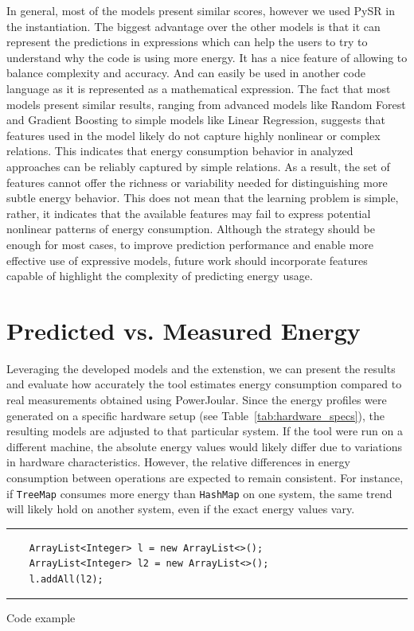 In general, most of the models present similar scores, however we used PySR in the instantiation. The biggest advantage over the other models is that it can represent the predictions in expressions which can help the users to try to understand why the code is using more energy. It has a nice feature of allowing to balance complexity and accuracy. And can easily be used in another code language as it is represented as a mathematical expression.
The fact that most models present similar results, ranging from advanced models like Random Forest and Gradient Boosting to simple models like Linear Regression, suggests that features used in the model likely do not capture highly nonlinear or complex relations. This indicates that energy consumption behavior in analyzed approaches can be reliably captured by simple relations. As a result, the set of features cannot offer the richness or variability needed for distinguishing more subtle energy behavior. This does not mean that the learning problem is simple, rather, it indicates that the available features may fail to express potential nonlinear patterns of energy consumption. Although the strategy should be enough for most cases, to improve prediction performance and enable more effective use of expressive models, future work should incorporate features capable of highlight the complexity of predicting energy usage.



\section{Predicted vs. Measured Energy} \label{sec:predicted_vs_measured_energy}

Leveraging the developed models and the extenstion, we can present the results and evaluate how accurately the tool estimates energy consumption compared to real measurements obtained using PowerJoular. Since the energy profiles were generated on a specific hardware setup (see Table~\ref{tab:hardware_specs}), the resulting models are adjusted to that particular system. If the tool were run on a different machine, the absolute energy values would likely differ due to variations in hardware characteristics. However, the relative differences in energy consumption between operations are expected to remain consistent. For instance, if \texttt{TreeMap} consumes more energy than \texttt{HashMap} on one system, the same trend will likely hold on another system, even if the exact energy values vary.

\begin{listing}[H]
\noindent\rule{\linewidth}{0.4pt}
\begin{verbatim}
    ArrayList<Integer> l = new ArrayList<>();
    ArrayList<Integer> l2 = new ArrayList<>();
    l.addAll(l2);
\end{verbatim}
\noindent\rule{\linewidth}{0.4pt}
\caption{Code example}            
\label{lst:code_example}
\end{listing}

